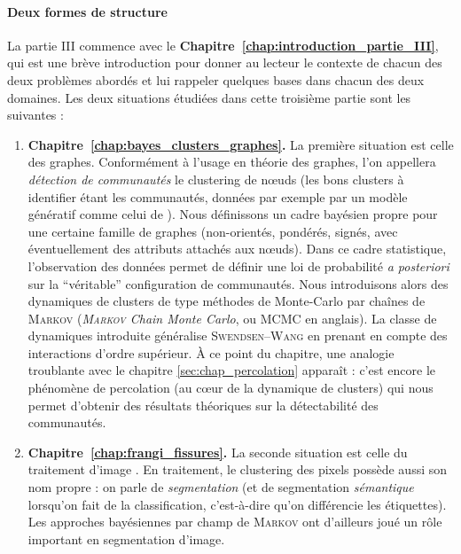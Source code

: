 \documentclass{these-ISSS} %
\begin{document}
\paragraph{Deux formes de structure}
La partie III commence avec le \textbf{Chapitre~\ref{chap:introduction_partie_III}}, qui est une brève introduction pour donner au lecteur le contexte de chacun des deux problèmes abordés et lui rappeler quelques bases dans chacun des deux domaines.
Les deux situations étudiées dans cette troisième partie sont les suivantes : %
\begin{enumerate}
    \item \textbf{Chapitre~\ref{chap:bayes_clusters_graphes}.} La première situation est celle des graphes. Conformément à l'usage en théorie des graphes, l'on appellera \emph{détection de communautés} le clustering de nœuds (les bons clusters à identifier étant les communautés, données par exemple par un modèle génératif comme celui de \SB{} \cite{SankararamanBaccelli2018}). 
    Nous définissons un cadre bayésien propre pour une certaine famille de graphes (non-orientés, pondérés, signés, avec éventuellement des attributs attachés aux nœuds). Dans ce cadre statistique, l'observation des données permet de définir une loi de probabilité \emph{a posteriori} sur la ``véritable'' configuration de communautés. Nous introduisons alors des dynamiques de clusters de type méthodes de Monte-Carlo par chaînes de \textsc{Markov} \cite{Robert1996MCMC} (\emph{\textsc{Markov} Chain Monte Carlo}, ou MCMC en anglais). La classe de dynamiques introduite généralise \textsc{Swendsen--Wang} \cite{SwendsenWang} en prenant en compte des interactions d'ordre supérieur. 
    À ce point du chapitre, une analogie troublante avec le chapitre \ref{sec:chap_percolation} apparaît : c'est encore le phénomène de percolation (au cœur de la dynamique de clusters) qui nous permet d'obtenir des résultats théoriques sur la détectabilité des communautés.
    \item \textbf{Chapitre~\ref{chap:frangi_fissures}.} La seconde situation est celle du traitement d'image \cite{jain1989fundamentals, Zerubia1995, Gonzalez2018ImageProcessing}. En traitement, le clustering des pixels possède aussi son nom propre : on parle de \emph{segmentation} (et de segmentation \emph{sémantique} lorsqu'on fait de la classification, c'est-à-dire qu'on différencie les étiquettes). Les approches bayésiennes par champ de \textsc{Markov} ont d'ailleurs joué un rôle important en segmentation d'image. 

\end{enumerate}
\end{document}
